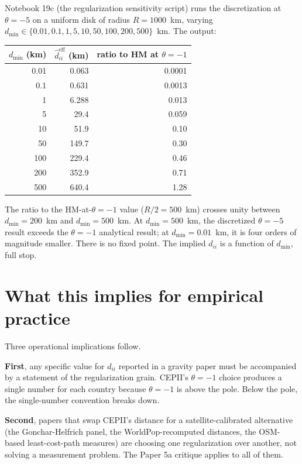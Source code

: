 \documentclass[11pt,letterpaper,oneside]{book}
\theoremstyle{definition}
\theoremstyle{remark}
\newcommand{\eff}{\mathrm{eff}}
\begin{document}
Notebook 19c (the regularization sensitivity script) runs the
discretization at $\theta = -5$ on a uniform disk of radius
$R = 1000$~km, varying $d_{\min} \in \{0.01, 0.1, 1, 5, 10, 50, 100, 200, 500\}$~km.
The output:
\begin{center}
\begin{tabular}{r r r}
\toprule
$d_{\min}$ (km) & $\hat{d}_{ii}^{\eff}$ (km) & ratio to HM at $\theta = -1$ \\
\midrule
0.01 & 0.063 & 0.0001 \\
0.1 & 0.631 & 0.0013 \\
1 & 6.288 & 0.013 \\
5 & 29.4 & 0.059 \\
10 & 51.9 & 0.10 \\
50 & 149.7 & 0.30 \\
100 & 229.4 & 0.46 \\
200 & 352.9 & 0.71 \\
500 & 640.4 & 1.28 \\
\bottomrule
\end{tabular}
\end{center}

The ratio to the HM-at-$\theta = -1$ value ($R/2 = 500$~km) crosses
unity between $d_{\min} = 200$~km and $d_{\min} = 500$~km. At
$d_{\min} = 500$~km, the discretized $\theta = -5$ result exceeds the
$\theta = -1$ analytical result; at $d_{\min} = 0.01$~km, it is four
orders of magnitude smaller. There is no fixed point. The implied
$d_{ii}$ is a function of $d_{\min}$, full stop.

\section{What this implies for empirical practice}

Three operational implications follow.

\textbf{First}, any specific value for $d_{ii}$ reported in a gravity
paper must be accompanied by a statement of the regularization grain.
CEPII's $\theta = -1$ choice produces a single number for each country
because $\theta = -1$ is above the pole. Below the pole, the
single-number convention breaks down.

\textbf{Second}, papers that swap CEPII's distance for a
satellite-calibrated alternative (the Gonchar-Helfrich panel, the
WorldPop-recomputed distances, the OSM-based least-cost-path measures)
are choosing one regularization over another, not solving a measurement
problem. The Paper 5a critique applies to all of them.
\end{document}
